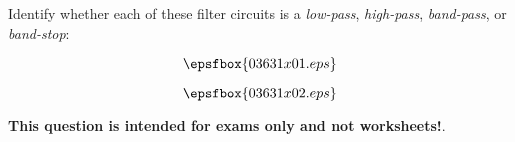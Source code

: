 

Identify whether each of these filter circuits is a {\it low-pass}, {\it high-pass}, {\it band-pass}, or {\it band-stop}:

\vskip 10pt

$$\epsfbox{03631x01.eps}$$







$$\epsfbox{03631x02.eps}$$







{\bf This question is intended for exams only and not worksheets!}.



